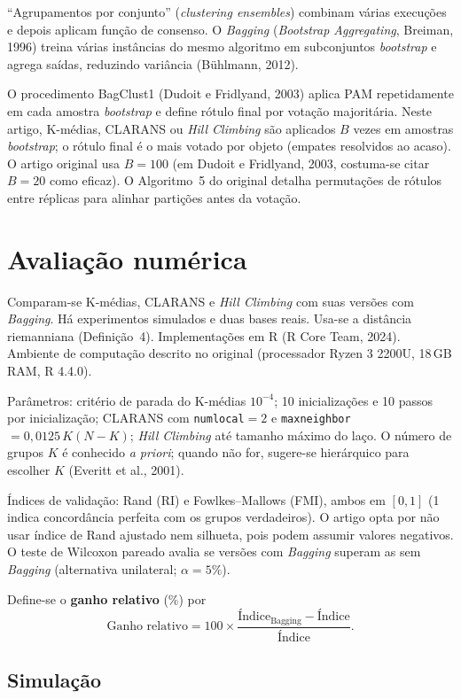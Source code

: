 \documentclass[11pt,a4paper]{article}
\begin{document}
``Agrupamentos por conjunto'' (\emph{clustering ensembles}) combinam várias execuções e depois aplicam função de consenso. O \emph{Bagging} (\emph{Bootstrap Aggregating}, Breiman, 1996) treina várias instâncias do mesmo algoritmo em subconjuntos \emph{bootstrap} e agrega saídas, reduzindo variância (Bühlmann, 2012).

O procedimento BagClust1 (Dudoit e Fridlyand, 2003) aplica PAM repetidamente em cada amostra \emph{bootstrap} e define rótulo final por votação majoritária. Neste artigo, K-médias, CLARANS ou \emph{Hill Climbing} são aplicados $B$ vezes em amostras \emph{bootstrap}; o rótulo final é o mais votado por objeto (empates resolvidos ao acaso). O artigo original usa $B=100$ (em Dudoit e Fridlyand, 2003, costuma-se citar $B=20$ como eficaz). O Algoritmo~5 do original detalha permutações de rótulos entre réplicas para alinhar partições antes da votação.

\section{Avaliação numérica}\label{sec:numerico}

Comparam-se K-médias, CLARANS e \emph{Hill Climbing} com suas versões com \emph{Bagging}. Há experimentos simulados e duas bases reais. Usa-se a distância riemanniana (Definição~4). Implementações em R (R Core Team, 2024). Ambiente de computação descrito no original (processador Ryzen 3 2200U, 18\,GB RAM, R 4.4.0).

Parâmetros: critério de parada do K-médias $10^{-4}$; 10 inicializações e 10 passos por inicialização; CLARANS com \texttt{numlocal}${}=2$ e \texttt{maxneighbor}$= 0{,}0125\, K(N-K)$; \emph{Hill Climbing} até tamanho máximo do laço. O número de grupos $K$ é conhecido \emph{a priori}; quando não for, sugere-se hierárquico para escolher $K$ (Everitt et al., 2001).

Índices de validação: Rand (RI) e Fowlkes--Mallows (FMI), ambos em $[0,1]$ (1 indica concordância perfeita com os grupos verdadeiros). O artigo opta por não usar índice de Rand ajustado nem silhueta, pois podem assumir valores negativos. O teste de Wilcoxon pareado avalia se versões com \emph{Bagging} superam as sem \emph{Bagging} (alternativa unilateral; $\alpha=5\%$).

Define-se o \textbf{ganho relativo} (\%) por
\[
  \text{Ganho relativo} = 100 \times \frac{\text{Índice}_{\text{Bagging}} - \text{Índice}}{\text{Índice}}.
\]

\subsection{Simulação}
\end{document}
